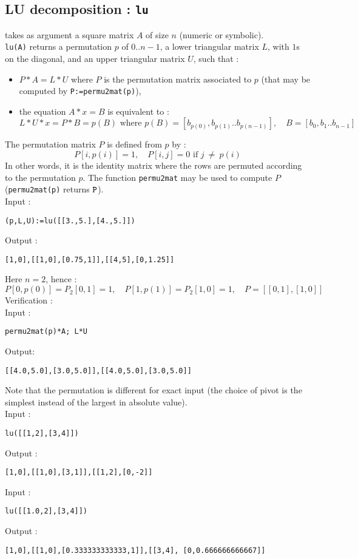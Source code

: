 \documentclass[a4paper,11pt]{book}
\begin{document}
\subsection{LU decomposition : {\tt lu}}
 takes as argument a square matrix $A$ of size $n$ (numeric or
symbolic).\\
{\tt lu(A)} returns a permutation $p$ of 0..$n-1$, 
a lower triangular matrix $L$, with $1$s on the diagonal, 
and an upper triangular matrix $U$, such that : 
\begin{itemize}
\item $P*A=L*U$ where $P$ is the permutation matrix 
associated to $p$ (that may be computed by {\tt P:=permu2mat(p)}),
\item the equation $A*x=B$ is equivalent to :
\[ L*U*x=P*B=p(B) \mbox{ where } p(B)=[b_{p(0)},b_{p(1)}..b_{p(n-1)}],
\quad  B=[b_0,b_1..b_{n-1}] \]
\end{itemize}
The permutation matrix $P$ is defined from $p$ by :
\[ P[i, p(i)]=1, \quad P[i, j]=0 \mbox{ if } j \ \neq\ p(i) \]
In other words, it is the identity matrix where the rows are permuted 
according to the permutation $p$. 
The function {\tt permu2mat} may be used to compute $P$
({\tt permu2mat(p)} returns ${\tt P}$).\\ 
Input :
\begin{center}{\tt (p,L,U):=lu([[3.,5.],[4.,5.]])}\end{center}
Output :
\begin{center}{\tt [1,0],[[1,0],[0.75,1]],[[4,5],[0,1.25]]}\end{center}
Here $n=2$, hence :
\[ P[0,p(0)]=P_2[0,1]=1, \quad  P[1,p(1)]=P_2[1,0]=1, \quad
P=[[0,1],[1,0]] \]
Verification :\\
Input :
\begin{center}{\tt permu2mat(p)*A; L*U}\end{center}
Output:
\begin{center}{\tt [[4.0,5.0],[3.0,5.0]],[[4.0,5.0],[3.0,5.0]]}\end{center}
Note that the permutation is different for exact input (the choice of
pivot is the simplest instead of the largest in absolute value).\\
Input :
\begin{center}{\tt lu([[1,2],[3,4]])}\end{center}
Output :
\begin{center}{\tt [1,0],[[1,0],[3,1]],[[1,2],[0,-2]]}\end{center}
Input :
\begin{center}{\tt lu([[1.0,2],[3,4]])}\end{center}
Output :
\begin{center}{\tt [1,0],[[1,0],[0.333333333333,1]],[[3,4], [0,0.666666666667]]}\end{center}
\end{document}
